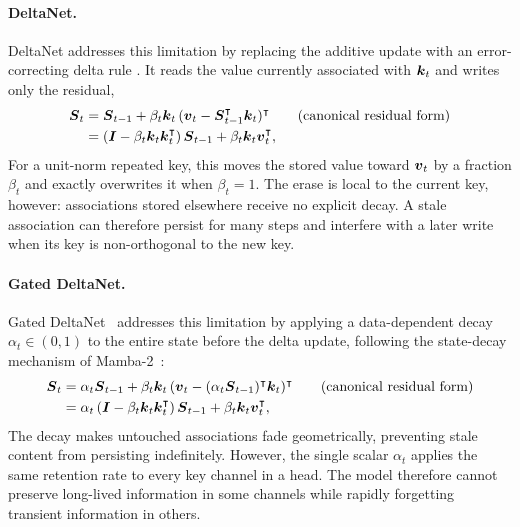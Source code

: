 \documentclass[11pt,letterpaper,logo]{yalearxiv}
\begin{document}
\paragraph{DeltaNet.}
DeltaNet addresses this limitation by replacing the additive update with an error-correcting
delta rule \citep{schlag2021linear,yang2024parallelizing}. It reads the value currently
associated with $\boldsymbol{k}_t$ and writes only the residual,
  \begin{equation}
  \begin{aligned}
    \boldsymbol{S}_t
      &= \boldsymbol{S}_{t-1}
         + \beta_t \boldsymbol{k}_t\,(\boldsymbol{v}_t-\boldsymbol{S}_{t-1}^{\intercal}\boldsymbol{k}_t)^{\intercal}
        \qquad\text{(canonical residual form)}\\
      &= (\boldsymbol{I}-\beta_t \boldsymbol{k}_t \boldsymbol{k}_t^{\intercal})\,\boldsymbol{S}_{t-1}
         + \beta_t \boldsymbol{k}_t \boldsymbol{v}_t^{\intercal},
  \end{aligned}
    \label{eq:deltanet}
  \end{equation}
  For a unit-norm repeated key, this moves the stored value toward $\boldsymbol{v}_t$ by a fraction
  $\beta_t$ and exactly overwrites it when $\beta_t=1$. The erase is local to the current key,
  however: associations stored elsewhere receive no explicit decay. A stale association can
  therefore persist for many steps and interfere with a later write when its key is
  non-orthogonal to the new key.

\paragraph{Gated DeltaNet.}
Gated DeltaNet~\citep{yang2024gdn} addresses this limitation by applying a data-dependent decay
$\alpha_t\in(0,1)$ to the entire state before the delta update, following the state-decay
mechanism of Mamba-2~\citep{dao2024transformers}:
  \begin{equation}
  \begin{aligned}
    \boldsymbol{S}_t
      &= \alpha_t \boldsymbol{S}_{t-1}
         + \beta_t \boldsymbol{k}_t\,(\boldsymbol{v}_t-(\alpha_t \boldsymbol{S}_{t-1})^{\intercal}\boldsymbol{k}_t)^{\intercal}
        \qquad\text{(canonical residual form)}\\
      &= \alpha_t\,(\boldsymbol{I}-\beta_t \boldsymbol{k}_t \boldsymbol{k}_t^{\intercal})\,\boldsymbol{S}_{t-1}
         + \beta_t \boldsymbol{k}_t \boldsymbol{v}_t^{\intercal},
  \end{aligned}
    \label{eq:gdn}
  \end{equation}
  The decay makes untouched associations fade geometrically, preventing stale content from
  persisting indefinitely. However, the single scalar $\alpha_t$ applies the same retention
  rate to every key channel in a head. The model therefore cannot preserve long-lived
  information in some channels while rapidly forgetting transient information in others.
\end{document}
